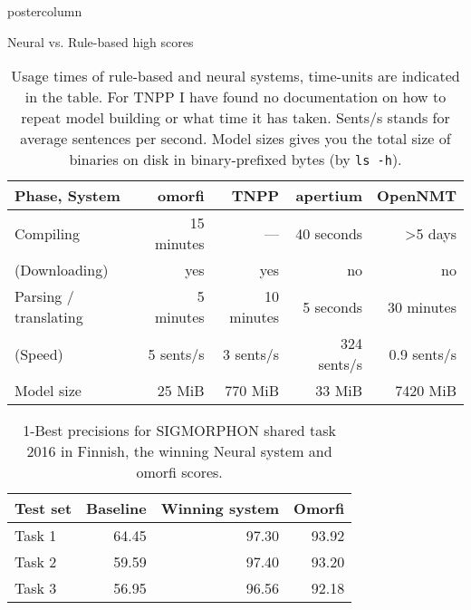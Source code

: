 \documentclass[final,hyperref={pdfpagelabels}]{beamer}
\begin{document}
\begin{frame}
\begin{columns}
\begin{column}{.49\textwidth}
\begin{beamercolorbox}[center,wd=\textwidth]{postercolumn}
\begin{minipage}[T]{.95\textwidth}
{        \begin{block}{Neural vs. Rule-based high scores}
\begin{table}
\begin{centering}
    \begin{tabular}{lrrrr}
        \toprule
        Phase, System & \bf omorfi & \bf TNPP & \bf apertium & \bf OpenNMT \\
        \midrule
        Compiling & 15 minutes & --- & 40 seconds & >5 days \\
        (Downloading) & yes & yes & no & no\\
        Parsing / translating & 5 minutes & 10 minutes  & 5 seconds & 30 minutes \\
        (Speed) & 5 sents/s & 3 sents/s & 324 sents/s & 0.9 sents/s \\
        \midrule
        Model size & 25 MiB & 770 MiB & 33 MiB & 7420 MiB \\
        \bottomrule
    \end{tabular}
    \caption{Usage times of rule-based and neural systems, time-units are
    indicated in the table. For TNPP I have found no documentation on how to
    repeat model building or what time it has taken. Sents/s stands for
    average sentences per second. Model sizes gives you the total size of
    binaries on disk in binary-prefixed bytes (by \texttt{ls -h}).
\label{table:times}}
\end{centering}
\end{table}
\begin{table}
\begin{centering}
    \begin{tabular}{lrrr}
        \toprule
        Test set & \bf Baseline & \bf Winning system & \bf Omorfi \\
        \midrule
        Task 1 & 64.45 & 97.30 & 93.92 \\
        Task 2 & 59.59 & 97.40 & 93.20 \\
        Task 3 & 56.95 & 96.56 & 92.18 \\
        \bottomrule
    \end{tabular}
    \caption{1-Best precisions for SIGMORPHON shared task 2016 in Finnish,
    the winning Neural system and omorfi scores.
\label{table:eval-sigmorphon}}
\end{centering}
\end{table}
\begin{table}
\begin{centering}
    \begin{tabular}{lrr}

\end{tabular}
\end{centering}
\end{table}
\end{block}}
\end{minipage}
\end{beamercolorbox}
\end{column}
\end{columns}
\end{frame}
\end{document}
